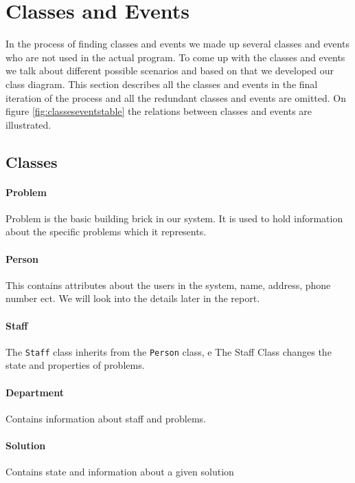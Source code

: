 \section{Classes and Events}
\label{cap:classesevents}
In the process of finding classes and events we made up several classes and events who are not used in the actual program. To come up with the classes and events we talk about different possible scenarios and based on that we developed our class diagram. This section describes all the classes and events in the final iteration of the process and all the redundant classes and events are omitted. On figure \ref{fig:classeseventstable} the relations between classes and events are illustrated.  

\subsection{Classes}

\paragraph{Problem}
Problem is the basic building brick in our system. It is used to hold information about the specific problems which it represents.

\paragraph{Person}
This contains attributes about the users in the system, name, address, phone number ect. We will look into the details later in the report.

\paragraph{Staff}
The \verb+Staff+ class inherits from the \verb+Person+ class, e
The Staff Class changes the state and properties of problems. 

\paragraph{Department}
Contains information about staff and problems.

\paragraph{Solution}
Contains state and information about a given solution



